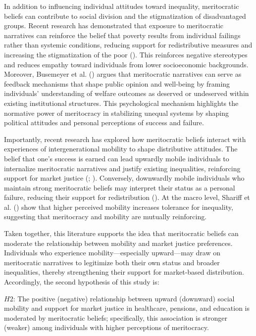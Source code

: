 \documentclass[
  12pt,
]{article}
\begin{document}
In addition to influencing individual attitudes toward inequality,
meritocratic beliefs can contribute to social division and the
stigmatization of disadvantaged groups. Recent research has demonstrated
that exposure to meritocratic narratives can reinforce the belief that
poverty results from individual failings rather than systemic
conditions, reducing support for redistributive measures and increasing
the stigmatization of the poor (). This reinforces negative stereotypes and reduces empathy
toward individuals from lower socioeconomic backgrounds. Moreover,
Busemeyer et al. () argues
that meritocratic narratives can serve as feedback mechanisms that shape
public opinion and well-being by framing individuals' understanding of
welfare outcomes as deserved or undeserved within existing institutional
structures. This psychological mechanism highlights the normative power
of meritocracy in stabilizing unequal systems by shaping political
attitudes and personal perceptions of success and failure.

Importantly, recent research has explored how meritocratic beliefs
interact with experiences of intergenerational mobility to shape
distributive attitudes. The belief that one's success is earned can lead
upwardly mobile individuals to internalize meritocratic narratives and
justify existing inequalities, reinforcing support for market justice
(;
). Conversely,
downwardly mobile individuals who maintain strong meritocratic beliefs
may interpret their status as a personal failure, reducing their support
for redistribution ().
At the macro level, Shariff et al.
() show that higher perceived
mobility increases tolerance for inequality, suggesting that meritocracy
and mobility are mutually reinforcing.

Taken together, this literature supports the idea that meritocratic
beliefs can moderate the relationship between mobility and market
justice preferences. Individuals who experience mobility---especially
upward---may draw on meritocratic narratives to legitimize both their
own status and broader inequalities, thereby strengthening their support
for market-based distribution. Accordingly, the second hypothesis of
this study is:

\(H2\): The positive (negative) relationship between upward (downward)
social mobility and support for market justice in healthcare, pensions,
and education is moderated by meritocratic beliefs; specifically, this
association is stronger (weaker) among individuals with higher
perceptions of meritocracy.
\end{document}
